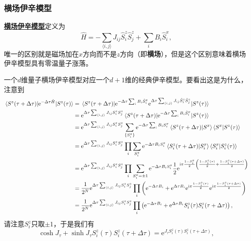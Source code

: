 \documentclass[hyperref, UTF8, a4paper]{ctexart}
\newcommand*{\ii}{\mathrm{i}}
\newcommand*{\ee}{\mathrm{e}}
\newcommand*{\pair}[1]{\langle #1 \rangle}
\renewcommand{\emph}[1]{\textbf{#1}}
\newcommand*{\concept}[1]{\underline{\textbf{#1}}}
\begin{document}
\subsubsection{横场伊辛模型}

\concept{横场伊辛模型}定义为
\begin{equation}
    \hat{H} = - \sum_{\pair{i, j}} J_{ij} \hat{S}_i^z \hat{S}_j^z + \sum_{i} B_i \hat{S}_i^x,
\end{equation}
唯一的区别就是磁场加在$x$方向而不是$z$方向（即\emph{横场}），但是这个区别意味着横场伊辛模型具有零温量子涨落。

一个$d$维量子横场伊辛模型对应一个$d+1$维的经典伊辛模型。要看出这是为什么，注意到
\[
    \begin{aligned}
        \mel{S^z(\tau + \Delta \tau)}{\ee^{-\Delta \tau \hat{H}}}{S^z(\tau)} &= \mel{S^z(\tau + \Delta \tau)}{\ee^{-\Delta \tau \sum_i B_i \hat{S}^x_i} \ee^{\Delta \tau \sum_{\pair{i, j}} J_{ij} \hat{S}_i^z \hat{S}_j^z}}{S^z(\tau)} \\
        &= \ee^{\Delta \tau \sum_{\pair{i, j}} J_{ij} S_i^z S_j^z} \mel{S^z(\tau + \Delta \tau)}{\ee^{-\Delta \tau \sum_i B_i \hat{S}^x_i}}{S^z(\tau)} \\
        &= \ee^{\Delta \tau \sum_{\pair{i, j}} J_{ij} S_i^z S_j^z} \sum_{\{S^x_i\}} \ee^{-\Delta \tau \sum_i B_i S^x_i} \braket{S^z(\tau + \Delta \tau)}{S^x} \braket{S^x}{S^z(\tau)} \\
        &= \ee^{\Delta \tau \sum_{\pair{i, j}} J_{ij} S_i^z S_j^z} \prod_{i} \sum_{S^x_i} \ee^{-\Delta \tau B_i S^x_i} \braket{S^z_i(\tau + \Delta \tau)}{S^x_i} \braket{S^x_i}{S^z_i(\tau)} \\
        &= \ee^{\Delta \tau \sum_{\pair{i, j}} J_{ij} S_i^z S_j^z} \prod_{i} \sum_{S^x_i = \pm 1} \ee^{-\Delta \tau B_i S^x_i} \frac{1}{2} \ee^{\ii \pi \frac{1 - S^x_i}{2} \left( \frac{1 - S^z_i(\tau)}{2} + \frac{1 - S^z_i(\tau + \Delta \tau)}{2} \right)} \\
        &= \frac{1}{2^N} \ee^{\Delta \tau \sum_{\pair{i, j}} J_{ij} S_i^z S_j^z} \prod_i \left( \ee^{- \Delta \tau B_i} + \ee^{\Delta \tau B_i} \ee^{\ii \pi \frac{1 - S^z_i(\tau)}{2}} \ee^{\ii \pi \frac{1 - S^z_i(\tau + \Delta \tau)}{2}} \right) \\
        &= \frac{1}{2^N} \ee^{\Delta \tau \sum_{\pair{i, j}} J_{ij} S_i^z S_j^z} \prod_i \left( \ee^{- \Delta \tau B_i} + \ee^{\Delta \tau B_i} S^z_i(\tau) S^z_i(\tau + \Delta \tau) \right),
    \end{aligned}
\]
请注意$S_i^z$只取$\pm 1$，于是我们有
\[
    \cosh J_\tau + \sinh J_\tau S^z_i(\tau) S^z_i(\tau + \Delta \tau) = \ee^{J_\tau S^z_i(\tau) S^z_i(\tau + \Delta \tau)},
\]
\end{document}

